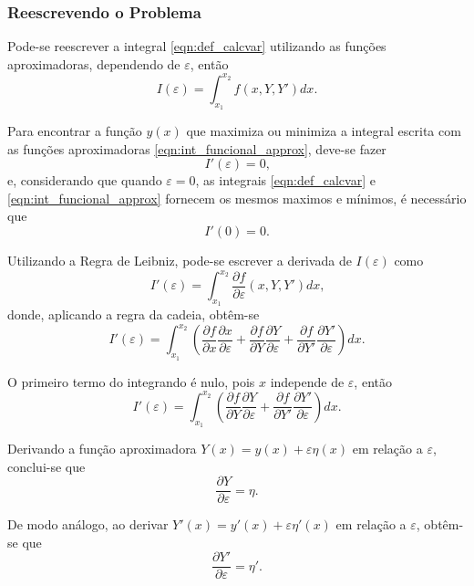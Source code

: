 \documentclass{beamer}
\begin{document}
	\begin{frame}
		\frametitle{Reescrevendo o Problema}
		\justify
	
		Pode-se reescrever a integral \eqref{eqn:def_calcvar} utilizando as funções aproximadoras, dependendo de $\varepsilon$, então
		\begin{equation}
			\label{eqn:int_funcional_approx}
			I(\varepsilon)=\int_{x_1}^{x_2}f(x, Y, Y')dx\text{.}
		\end{equation}
	
		Para encontrar a função $y(x)$ que maximiza ou minimiza a integral escrita com as funções aproximadoras \eqref{eqn:int_funcional_approx}, deve-se fazer
		$$I'(\varepsilon)=0\text{,}$$
		e, considerando que quando $\varepsilon=0$, as integrais \eqref{eqn:def_calcvar} e \eqref{eqn:int_funcional_approx} fornecem os mesmos maximos e mínimos, é necessário que
		$$I'(0)=0\text{.}$$
	\end{frame}

	\begin{frame}
		\justify
	
		Utilizando a Regra de Leibniz, pode-se escrever a derivada de $I(\varepsilon)$ como
		$$I'(\varepsilon)=\int_{x_1}^{x_2} \frac{\partial f}{\partial \varepsilon} (x, Y, Y') dx \text{,}$$
		\pause
		donde, aplicando a regra da cadeia, obtêm-se
		$$I'(\varepsilon)=\int_{x_1}^{x_2}\left ( \frac{\partial f}{\partial x}\frac{\partial x}{\partial \varepsilon} + \frac{\partial f}{\partial Y} \frac{\partial Y}{\partial \varepsilon} + \frac{\partial f}{\partial Y'} \frac{\partial Y'}{\partial \varepsilon} \right )dx\text{.}$$
		\pause
	
		O primeiro termo do integrando é nulo, pois $x$ independe de $\varepsilon$, então
		$$
			I'(\varepsilon)=\int_{x_1}^{x_2}\left ( \frac{\partial f}{\partial Y}\frac{\partial Y}{\partial \varepsilon} + \frac{\partial f}{\partial Y'}\frac{\partial Y'}{\partial \varepsilon} \right ) dx \text{.}
		$$
	\end{frame}

	\begin{frame}
		\justify
	
		Derivando a função aproximadora $Y(x)=y(x)+\varepsilon \eta(x)$ em relação a $\varepsilon$, conclui-se que
		$$\frac{\partial Y}{\partial \varepsilon}=\eta\text{.}$$
		\pause
	
		De modo análogo, ao derivar $Y'(x)=y'(x)+\varepsilon \eta '(x)$ em relação a $\varepsilon$, obtêm-se que
		$$\frac{\partial Y'}{\partial \varepsilon}=\eta '\text{.}$$
	\end{frame}
\end{document}
